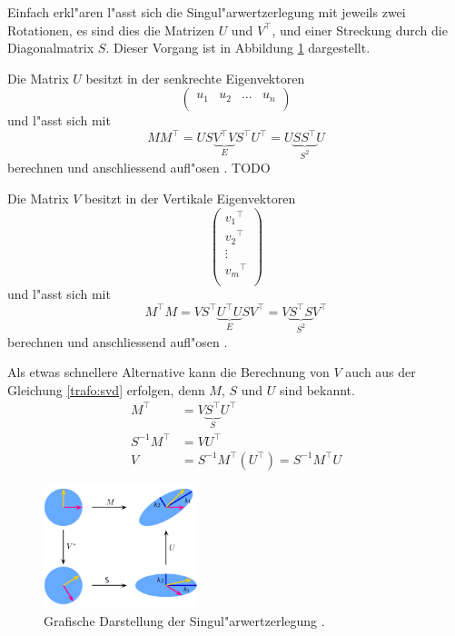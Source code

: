 \begin{refsection}
Einfach erkl"aren l"asst sich die Singul"arwertzerlegung mit jeweils zwei Rotationen, es sind dies die Matrizen $U$ und $V^\top$, und einer Streckung durch die Diagonalmatrix $S$. Dieser Vorgang ist in Abbildung \ref{trafo:SVDFig} dargestellt. 

Die Matrix $U$ besitzt in der senkrechte Eigenvektoren
\begin{equation*}
	\left( 
		\begin{array}{cccc}
		u_1 & u_2 & \dots & u_n  \\		
		\end{array}
	\right) 
\end{equation*}
und l"asst sich mit 
\begin{equation*}
	M M^\top = U S \underbrace{V^\top V}_{E} S^\top U^\top = U \underbrace{S S^\top}_{S^2} U
\end{equation*}
berechnen und anschliessend aufl"osen \cite{trafo:Watkins}. \color{red}TODO\color{black}

Die Matrix $V$ besitzt in der Vertikale Eigenvektoren
\begin{equation*}
	\left( 
		\begin{array}{c}
		{v_1}^{\top}\\
		{v_2}^{\top}\\
		\vdots\\
		{v_m}^{\top}\\			
		\end{array}
	\right) 
\end{equation*}
und l"asst sich mit 
\begin{equation*}
	M^\top M = V S^\top \underbrace{U^\top U}_{E} S V^\top = V \underbrace{S^\top S}_{S^2} V^\top 
\end{equation*}
berechnen und anschliessend aufl"osen \cite{trafo:Watkins}.

Als etwas schnellere Alternative kann die Berechnung von $V$ auch aus der Gleichung \ref{trafo:svd} erfolgen, denn $M$, $S$ und $U$ sind bekannt. 
\begin{align*}
	M^\top &= V \underbrace{S^\top}_{S} U^\top\\
	S^{-1} M^\top &= V U^\top\\
	V &= S^{-1} M^\top \left(U^\top\right) = S^{-1} M^\top U
\end{align*}

\begin{figure}
	\centering
	\includegraphics[width=0.4\textwidth]{./trafo/images/svd.png}
	\caption{Grafische Darstellung der Singul"arwertzerlegung \cite{trafo:SVDWiki}.}
	\label{trafo:SVDFig}
\end{figure}


\end{refsection}
